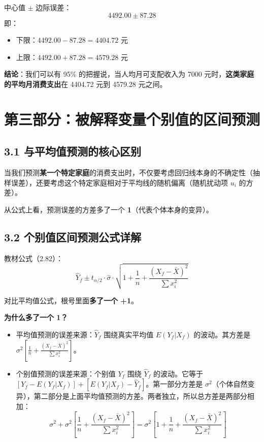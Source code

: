 \documentclass[12pt,a4paper]{article}
\begin{document}
中心值 \(\pm\) 边际误差：
\[
4492.00 \pm 87.28
\]
即：
\begin{itemize}
\item 下限：\(4492.00 - 87.28 = 4404.72\) 元
\item 上限：\(4492.00 + 87.28 = 4579.28\) 元
\end{itemize}

\textbf{结论}：我们可以有 95\% 的把握说，当人均月可支配收入为 7000 元时，\textbf{这类家庭的平均月消费支出}在 4404.72 元到 4579.28 元之间。

\section*{第三部分：被解释变量个别值的区间预测}

\subsection*{3.1 与平均值预测的核心区别}

当我们预测\textbf{某一个特定家庭}的消费支出时，不仅要考虑回归线本身的不确定性（抽样误差），还要考虑这个特定家庭相对于平均线的随机偏离（随机扰动项 \(u_i\) 的方差）。

从公式上看，预测误差的方差多了一个 \textbf{1}（代表个体本身的变异）。

\subsection*{3.2 个别值区间预测公式详解}

教材公式（2.82）：
\[
\hat{Y}_f \pm t_{\alpha/2} \cdot \hat{\sigma} \cdot \sqrt{ 1 + \frac{1}{n} + \frac{(X_f - \bar{X})^2}{\sum x_i^2} }
\]

对比平均值公式，根号里面\textbf{多了一个 +1}。

\textbf{为什么多了一个 1？}

\begin{itemize}
\item 平均值预测的误差来源：\(\hat{Y}_f\) 围绕真实平均值 \(E(Y_f|X_f)\) 的波动。其方差是 \(\sigma^2 \left[ \frac{1}{n} + \frac{(X_f - \bar{X})^2}{\sum x_i^2} \right]\)。
\item 个别值预测的误差来源：个别值 \(Y_f\) 围绕 \(\hat{Y}_f\) 的波动。它等于 \([Y_f - E(Y_f|X_f)] + [E(Y_f|X_f) - \hat{Y}_f]\)。第一部分方差是 \(\sigma^2\)（个体自然变异），第二部分是上面平均值预测的方差。两者独立，所以总方差是两部分相加：
  \[
  \sigma^2 + \sigma^2 \left[ \frac{1}{n} + \frac{(X_f - \bar{X})^2}{\sum x_i^2} \right] = \sigma^2 \left[ 1 + \frac{1}{n} + \frac{(X_f - \bar{X})^2}{\sum x_i^2} \right]
  \]
\end{itemize}
\end{document}
